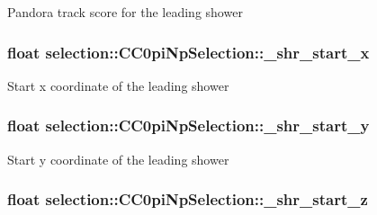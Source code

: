 Pandora track score for the leading shower \hypertarget{classselection_1_1CC0piNpSelection_ac0fb4dbd656f2f3fb2c12ffc02a0df7c}{
\subsubsection[{\-\_\-shr\-\_\-start\-\_\-x}]{\setlength{\rightskip}{0pt plus 5cm}float selection\-::\-C\-C0pi\-Np\-Selection\-::\-\_\-shr\-\_\-start\-\_\-x\hspace{0.3cm}{\ttfamily [private]}}}\label{classselection_1_1CC0piNpSelection_ac0fb4dbd656f2f3fb2c12ffc02a0df7c}
Start x coordinate of the leading shower \hypertarget{classselection_1_1CC0piNpSelection_ade6717f479b053a2c2c9082e597d599f}{
\subsubsection[{\-\_\-shr\-\_\-start\-\_\-y}]{\setlength{\rightskip}{0pt plus 5cm}float selection\-::\-C\-C0pi\-Np\-Selection\-::\-\_\-shr\-\_\-start\-\_\-y\hspace{0.3cm}{\ttfamily [private]}}}\label{classselection_1_1CC0piNpSelection_ade6717f479b053a2c2c9082e597d599f}
Start y coordinate of the leading shower \hypertarget{classselection_1_1CC0piNpSelection_a6e8b4637c8de2991e4d48291d3e90ddf}{
\subsubsection[{\-\_\-shr\-\_\-start\-\_\-z}]{\setlength{\rightskip}{0pt plus 5cm}float selection\-::\-C\-C0pi\-Np\-Selection\-::\-\_\-shr\-\_\-start\-\_\-z\hspace{0.3cm}{\ttfamily [private]}}}\label{classselection_1_1CC0piNpSelection_a6e8b4637c8de2991e4d48291d3e90ddf}
